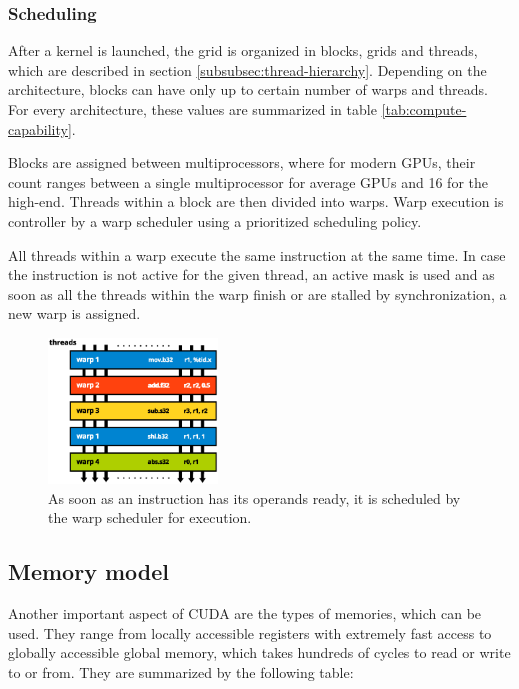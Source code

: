 \FloatBarrier

\subsubsection{Scheduling}\label{subsubsec:scheduling}

After a kernel is launched, the grid is organized in blocks, grids and threads, which are described in section \ref{subsubsec:thread-hierarchy}. Depending on the architecture, blocks can have only up to certain number of warps and threads. For every architecture, these values are summarized in table \ref{tab:compute-capability}.

Blocks are assigned between multiprocessors, where for modern GPUs, their count ranges between a single multiprocessor for average GPUs and 16 for the high-end. Threads within a block are then divided into warps. Warp execution is controller by a warp scheduler using a prioritized scheduling policy.

All threads within a warp execute the same instruction at the same time. In case the instruction is not active for the given thread, an active mask is used and as soon as all the threads within the warp finish or are stalled by synchronization, a new warp is assigned.

\begin{figure}[h]
	\begin{center}
	\includegraphics[width=0.4\textwidth]{fig/scheduling.eps}
	\caption{As soon as an instruction has its operands ready, it is scheduled by the warp scheduler for execution.}
	\label{fig:scheduling}
	\end{center}
\end{figure}

\subsection{Memory model}\label{subsec:memory}

Another important aspect of CUDA are the types of memories, which can be used. They range from locally accessible registers with extremely fast access to globally accessible global memory, which takes hundreds of cycles to read or write to or from. They are summarized by the following table:

